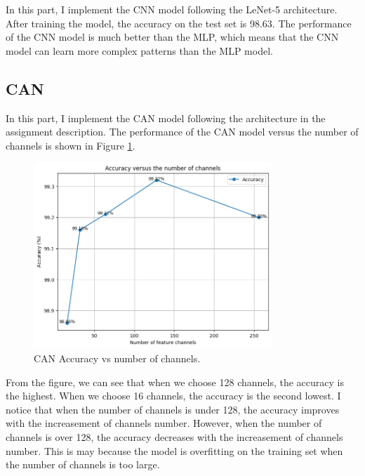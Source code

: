 \documentclass[12pt]{article}
\begin{document}
In this part, I implement the CNN model following the LeNet-5 architecture.
After training the model, the accuracy on the test set is 98.63\text{\%}.
The performance of the CNN model is much better than the MLP, which means that the CNN model can learn more complex patterns than the MLP model.

\subsection{CAN}

In this part, I implement the CAN model following the architecture in the assignment description.
The performance of the CAN model versus the number of channels is shown in Figure \ref{fig:can_accuracy}.

\begin{figure}[H]
  \centering
  \includegraphics[width=0.8\textwidth]{CAN.png}
  \caption{CAN Accuracy vs number of channels.}
  \label{fig:can_accuracy}
\end{figure}

From the figure, we can see that when we choose 128 channels, the accuracy is the highest.
When we choose 16 channels, the accuracy is the second lowest.
I notice that when the number of channels is under 128, the accuracy improves with the increasement of channels number.
However, when the number of channels is over 128, the accuracy decreases with the increasement of channels number.
This is may because the model is overfitting on the training set when the number of channels is too large.
\end{document}
